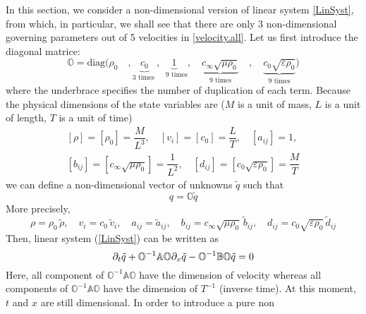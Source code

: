 \documentclass[
10pt, %
a4paper, %
oneside, %
headinclude,footinclude, %
table
]{scrartcl}
\begin{document}
In this section, we consider a non-dimensional version of linear system \eqref{LinSyst}, from 
which, in particular, we shall see that there are only 3 non-dimensional governing parameters out 
of 5 velocities 
in \eqref{velocity.all}. 
Let us first introduce the diagonal matrice:
\begin{equation}
\mathbb{O}=\text{diag}\Big(\rho_{0}\quad,
	\underbrace{c_{0}}_\text{$3$ times },
	\underbrace{1}_\text{ $9$ times}, \quad
	\underbrace{c_{\infty}\sqrt{\mu\rho_{0}}}_{\text{$9$ times}}\quad ,\quad
	\underbrace{c_{0}\sqrt{\varepsilon\rho_{0}}}_{\text{$9$ times}} \Big)
\end{equation}
where the underbrace specifies the number of duplication of each term. Because the physical 
dimensions of the state variables are \cite{PRD-Torsion2019} ($ M $ is a unit of mass, $ L $ is 
a unit of length, $ T $ is a unit of time)
\begin{equation}
	\begin{array}{c}    
		\left[\rho\right]=\left[\rho_{0}\right]=\dfrac{M}{L^3}, \quad
		\left[v_{i}\right]=\left[c_{0}\right]=\dfrac{L}{T}, \quad
		\left[a_{ij}\right]=1,\\[2mm]
		\left[b_{ij}\right]=\left[c_{\infty}\sqrt{\mu\rho_{0}}\right]=\dfrac{1}{L^2}, \quad
		\left[d_{ij}\right]=\left[c_{0}\sqrt{\varepsilon\rho_{0}} \right]=\dfrac{M}{T}
	\end{array}
\end{equation}
we can define a non-dimensional vector of unknowns $\tilde{q}$ such that
\begin{equation}
q=\mathbb{O}\tilde{q}
\end{equation}
More precisely,
\begin{equation}\label{key}
\rho=\rho_{0}\, \tilde{\rho}, \quad
v_{i}=c_{0}\, \tilde{v}_{i}, \quad
a_{ij}=\tilde{a}_{ij}, \quad
b_{ij}=c_{\infty}\sqrt{\mu\rho_{0}}\, \tilde{b}_{ij}, \quad
d_{ij}=c_{0}\sqrt{\varepsilon\rho_{0}}\, \tilde{d}_{ij}
\end{equation}
Then, linear system (\ref{LinSyst}) can be written as 
\begin{equation}
\partial_{t}\tilde{q}+\mathbb{O}^{-1}\mathbb{A}\mathbb{O}\partial_{x}\tilde{q}-\mathbb{O}^{-1}\mathbb{B}\mathbb{O}\tilde{q}=0
\end{equation}
Here, all component of $\mathbb{O}^{-1}\mathbb{A}\mathbb{O}$ have the dimension of velocity whereas 
all components of  $\mathbb{O}^{-1}\mathbb{A}\mathbb{O}$ have the dimension of $T^{-1}$ (inverse 
time). At this moment, $t$ and $x$ are still dimensional. In order to introduce a pure non 
\end{document}
